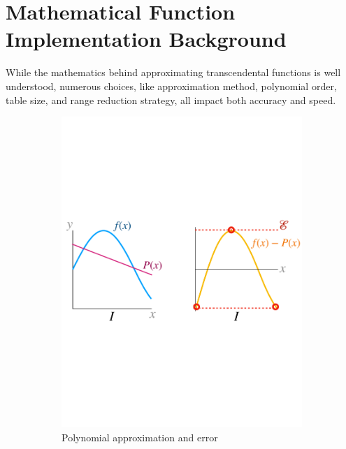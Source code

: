\documentclass[paper.tex]{subfiles}
\begin{document}
\section{Mathematical Function Implementation Background}
\label{sec:implementations}

While the mathematics behind approximating transcendental functions
  is well understood,
  numerous choices, like approximation method,
  polynomial order, table size, and range reduction strategy,
  all impact both accuracy and speed.


\begin{figure}
\begin{subfigure}{0.60\textwidth}
\includegraphics[width=\textwidth]{images/poly.pdf}
\caption{Polynomial approximation and error}
\label{fig:poly}
\end{subfigure} \hfill%
\begin{subfigure}{0.315\textwidth}

\end{subfigure}
\end{figure}
\end{document}
